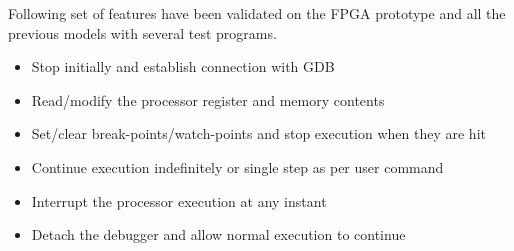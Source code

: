 Following set of features have been validated on the FPGA prototype and all the previous models with several test programs.
\begin{itemize}
	\item Stop initially and establish connection with GDB
	\item Read/modify the processor register and memory contents
	\item Set/clear break-points/watch-points and stop execution when they are hit
	\item Continue execution indefinitely or single step as per user command
	\item Interrupt the processor execution at any instant 
	\item Detach the debugger and allow normal execution to continue
\end{itemize}